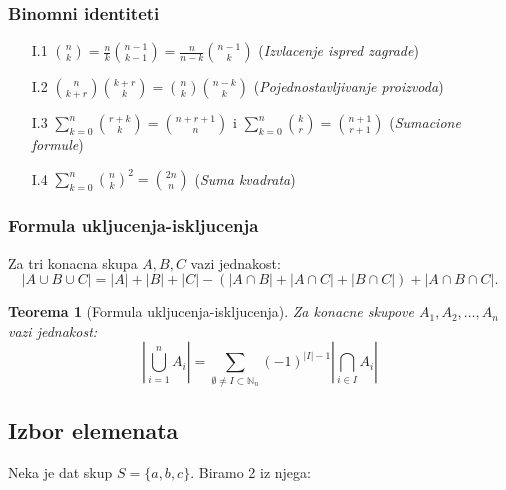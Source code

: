 \documentclass[12p, a4paper]{article}
\newtheorem*{theorem}{Teorema}
\begin{document}
\begin{multicols}{2}
    \subsubsection{Binomni identiteti}

    \begin{enumerate}
        \itemsep0em
        \item [I.1] $\binom{n}{k} = \frac{n}{k} \binom{n - 1}{k - 1} = 
            \frac{n}{n - k} \binom{n - 1}{k}$
            (\emph{Izvlacenje ispred zagrade})
        \item [I.2] $\binom{n}{k + r} \binom{k + r}{k} = 
            \binom{n}{k} \binom{n - k}{k}$
            (\emph{Pojednostavljivanje proizvoda})
        \item [I.3] $\sum_{k = 0}^n \binom{r + k}{k} = \binom{n + r + 1}{n}$ i
            $\sum_{k = 0}^n \binom{k}{r} = \binom{n + 1}{r + 1}$
            (\emph{Sumacione formule})
        \item [I.4] $\sum_{k = 0}^n {\binom{n}{k}}^2 = \binom{2n}{n}$
            (\emph{Suma kvadrata})
    \end{enumerate}

    \subsubsection{Formula ukljucenja-iskljucenja}

    Za tri konacna skupa $A, B, C$ vazi jednakost:
    \[
        |A \cup B \cup C| = |A| + |B| + |C| - 
        (|A \cap B| + |A \cap C| + |B \cap C|) +
        |A \cap B \cap C|.
    \]
    
    \begin{theorem}[Formula ukljucenja-iskljucenja]
        Za konacne skupove $A_1, A_2, \ldots, A_n$ vazi jednakost:
        \[
            \left| \bigcup_{i = 1}^n A_i \right| = 
            \sum_{\emptyset \neq I \subset \mathbb{N}_n}
            {(-1)}^{|I| - 1} \left| \bigcap_{i \in I} A_i \right|
        \]
    \end{theorem}

    \subsection{Izbor elemenata}
    
    Neka je dat skup $S= \{a, b, c\}$. Biramo 2 iz njega:


\end{multicols}
\end{document}
